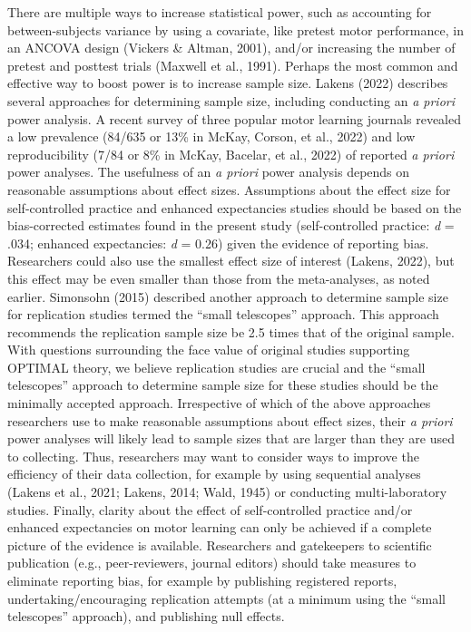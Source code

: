 \documentclass[
  doc, donotrepeattitle,floatsintext]{apa7}
\begin{document}
There are multiple ways to increase statistical power, such as accounting for between-subjects variance by using a covariate, like pretest motor performance, in an ANCOVA design (Vickers \& Altman, 2001), and/or increasing the number of pretest and posttest trials (Maxwell et al., 1991). Perhaps the most common and effective way to boost power is to increase sample size. Lakens (2022) describes several approaches for determining sample size, including conducting an \emph{a priori} power analysis. A recent survey of three popular motor learning journals revealed a low prevalence (84/635 or 13\% in McKay, Corson, et al., 2022) and low reproducibility (7/84 or 8\% in McKay, Bacelar, et al., 2022) of reported \emph{a priori} power analyses. The usefulness of an \emph{a priori} power analysis depends on reasonable assumptions about effect sizes. Assumptions about the effect size for self-controlled practice and enhanced expectancies studies should be based on the bias-corrected estimates found in the present study (self-controlled practice: \emph{d} = .034; enhanced expectancies: \emph{d} = 0.26) given the evidence of reporting bias. Researchers could also use the smallest effect size of interest (Lakens, 2022), but this effect may be even smaller than those from the meta-analyses, as noted earlier. Simonsohn (2015) described another approach to determine sample size for replication studies termed the ``small telescopes'' approach. This approach recommends the replication sample size be 2.5 times that of the original sample. With questions surrounding the face value of original studies supporting OPTIMAL theory, we believe replication studies are crucial and the ``small telescopes'' approach to determine sample size for these studies should be the minimally accepted approach. Irrespective of which of the above approaches researchers use to make reasonable assumptions about effect sizes, their \emph{a priori} power analyses will likely lead to sample sizes that are larger than they are used to collecting. Thus, researchers may want to consider ways to improve the efficiency of their data collection, for example by using sequential analyses (Lakens et al., 2021; Lakens, 2014; Wald, 1945) or conducting multi-laboratory studies. Finally, clarity about the effect of self-controlled practice and/or enhanced expectancies on motor learning can only be achieved if a complete picture of the evidence is available. Researchers and gatekeepers to scientific publication (e.g., peer-reviewers, journal editors) should take measures to eliminate reporting bias, for example by publishing registered reports, undertaking/encouraging replication attempts (at a minimum using the ``small telescopes'' approach), and publishing null effects.
\end{document}
